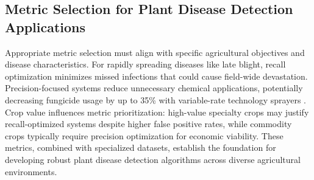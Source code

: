 \documentclass[sn-mathphys]{sn-jnl}
\theoremstyle{thmstyleone}%
\theoremstyle{thmstyletwo}%
\theoremstyle{thmstylethree}%
\begin{document}
\begin{table}[h!]
\centering
\small
\caption{Summary of Evaluation Metrics for Plant Disease Detection Applications}
\label{tab:metrics_summary}
\end{table}

\subsection{Metric Selection for Plant Disease Detection Applications}

Appropriate metric selection must align with specific agricultural objectives and disease characteristics. For rapidly spreading diseases like late blight, recall optimization minimizes missed infections that could cause field-wide devastation. Precision-focused systems reduce unnecessary chemical applications, potentially decreasing fungicide usage by up to 35\% with variable-rate technology sprayers \citep{tona2018profitability}. Crop value influences metric prioritization: high-value specialty crops may justify recall-optimized systems despite higher false positive rates, while commodity crops typically require precision optimization for economic viability. These metrics, combined with specialized datasets, establish the foundation for developing robust plant disease detection algorithms across diverse agricultural environments.
\end{document}

